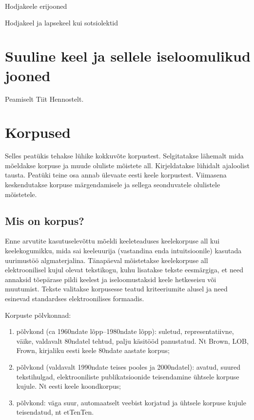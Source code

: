\documentclass[12pt]{article}
\begin{document}
Hodjakeele erijooned

Hodjakeel ja lapsekeel kui sotsiolektid




\newpage
\section{Suuline keel ja sellele iseloomulikud jooned}
Peamiselt Tiit Hennostelt.

\newpage
\section{Korpused}
Selles peatükis tehakse lühike kokkuvõte korpustest. Selgitatakse lähemalt mida mõeldakse korpuse ja muude
oluliste mõistete all. Kirjeldatakse lühidalt ajaloolist tausta. Peatüki teine osa annab ülevaate eesti keele korpustest. Viimasena keskendutakse korpuse märgendamisele ja sellega seonduvatele olulistele mõistetele.

\subsection{Mis on korpus?}
Enne arvutite kasutuselevõttu mõeldi keeleteaduses keelekorpuse all kui keelekogumikku, mida sai
keeleuurija (vastandina enda intuitsioonile) kasutada uurimustöö algmaterjalina. Tänapäeval mõistetakse
keelekorpuse all elektroonilisel kujul olevat tekstikogu, kuhu lisatakse tekste eesmärgiga, et need annaksid
tõepärase pildi keelest ja iseloomustaksid keele hetkeseisu või muutumist. Tekste valitakse korpusesse teatud kriteeriumite alusel ja need esinevad standardses elektroonilises formaadis. \citep[9]{KR}

Korpuste põlvkonnad:
\begin{enumerate}
\item põlvkond (ca 1960ndate lõpp--1980ndate lõpp): suletud, representatiivne, väike, valdavalt 80ndatel
tehtud, palju käsitööd panustatud. Nt Brown, LOB, Frown, kirjaliku eesti keele 80ndate aastate korpus;
\item põlvkond (valdavalt 1990ndate teises pooles ja 2000ndatel): avatud, suured tekstihulgad,
elektrooniliste publikatsioonide teisendamine ühtsele korpuse kujule. Nt eesti keele koondkorpus;
\item põlvkond: väga suur, automaatselt veebist korjatud ja ühtsele korpuse kujule teisendatud, nt etTenTen.
\citep{KT}
\end{enumerate}
\end{document}
